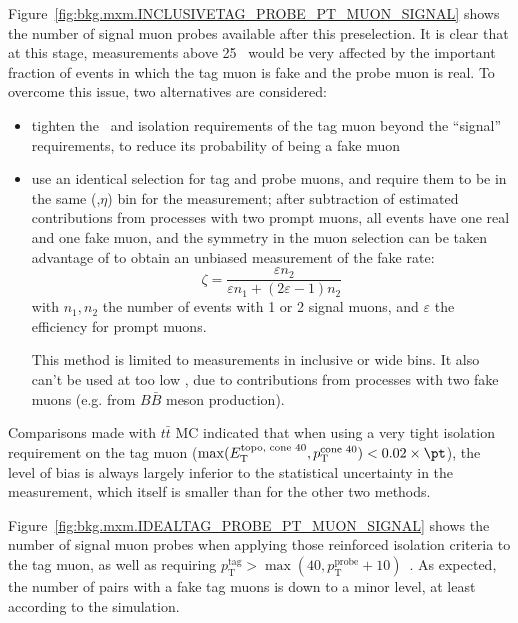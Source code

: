 Figure~\ref{fig:bkg.mxm.INCLUSIVETAG_PROBE_PT_MUON_SIGNAL} shows the number of signal muon probes available after this preselection. 
It is clear that at this stage, measurements above 25 \GeV~would be very affected by the important fraction of events 
in which the tag muon is fake and the probe muon is real. 
To overcome this issue, two alternatives are considered: 
\begin{itemize}
\item tighten the \pt\ and isolation requirements of the tag muon beyond the ``signal'' requirements,
to reduce its probability of being a fake muon
\item use an identical selection for tag and probe muons, and require them to be in the same (\pt,$\eta$) bin for the measurement; 
after subtraction of estimated contributions from processes with two prompt muons, all events have one real and one fake muon, 
and the symmetry in the muon selection can be taken advantage of to obtain an unbiased measurement of the fake rate: 
$$
\zeta = \frac{\varepsilon n_2}{\varepsilon n_1+(2\varepsilon-1)n_2}
$$
with $n_1, n_2$ the number of events with 1 or 2 signal muons, 
and $\varepsilon$ the efficiency for prompt muons.

This method is limited to measurements in inclusive or wide bins. 
It also can't be used at too low \pt, due to contributions from processes with two fake muons (e.g. from $B\bar B$ meson production). 
\end{itemize}
Comparisons made with $t\bar t$ MC indicated that when using a very tight isolation requirement on the tag muon 
($\operatorname{max}(E_\mathrm{T}^\text{topo, cone 40},p_\mathrm{T}^\text{cone 40})<0.02\times\pt$), 
the level of bias is always largely inferior to the statistical uncertainty in the measurement, 
which itself is smaller than for the other two methods. 

Figure~\ref{fig:bkg.mxm.IDEALTAG_PROBE_PT_MUON_SIGNAL} shows the number of signal muon probes when applying those reinforced isolation criteria to the tag muon, 
as well as requiring $p_\mathrm{T}^\text{tag}>\operatorname{max}(40,p_\mathrm{T}^\text{probe}+10)$~\GeV. 
As expected, the number of pairs with a fake tag muons is down to a minor level, at least according to the simulation. 

